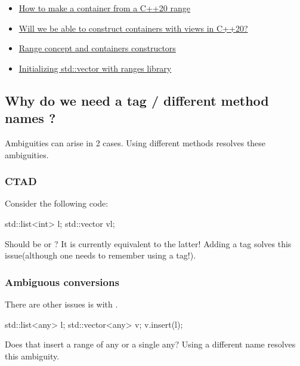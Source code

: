\documentclass{wg21}
\begin{document}
\begin{itemize}
\item \href{https://timur.audio/how-to-make-a-container-from-a-c20-range}{How to make a container from a C++20 range}
\item \href{https://stackoverflow.com/questions/59452296/will-we-be-able-to-construct-containers-with-views-in-c20}{Will we be able to construct containers with views in C++20?}
\item \href{https://stackoverflow.com/questions/62043660/range-concept-and-containers-constructors}{Range concept and containers constructors}
\item \href{https://stackoverflow.com/questions/62043660/range-concept-and-containers-constructors}{Initializing std::vector with ranges library}
\end{itemize}

\subsection{Why do we need a tag / different method names ?}

Ambiguities can arise in 2 cases. Using different methods resolves these ambiguities.

\subsubsection{CTAD}

Consider the following code:

\begin{colorblock}
std::list<int> l;
std::vector v{l};
\end{colorblock}

Should  be  or  ?
It is currently equivalent to the latter!
Adding a tag solves this issue(although one needs to remember using a tag!).

\subsubsection{Ambiguous conversions}

There are other issues is with .

\begin{colorblock}
std::list<any> l;
std::vector<any> v;
v.insert(l);
\end{colorblock}

Does that insert a range of any or a single any?
Using a different name resolves this ambiguity.
\end{document}
